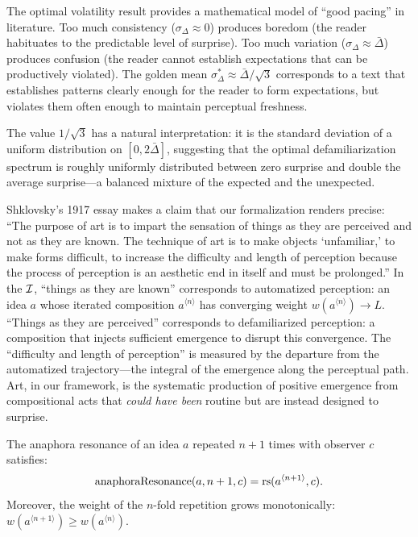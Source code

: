 \begin{remark}
The optimal volatility result provides a mathematical model of ``good
pacing'' in literature.  Too much consistency ($\sigma_\Delta \approx 0$)
produces boredom (the reader habituates to the predictable level of surprise).
Too much variation ($\sigma_\Delta \approx \bar{\Delta}$) produces confusion
(the reader cannot establish expectations that can be productively violated).
The golden mean $\sigma_\Delta^\ast \approx \bar{\Delta}/\sqrt{3}$ corresponds
to a text that establishes patterns clearly enough for the reader to form
expectations, but violates them often enough to maintain perceptual freshness.

The value $1/\sqrt{3}$ has a natural interpretation: it is the standard
deviation of a uniform distribution on $[0, 2\bar{\Delta}]$, suggesting that
the optimal defamiliarization spectrum is roughly uniformly distributed between
zero surprise and double the average surprise---a balanced mixture of the
expected and the unexpected.
\end{remark}


\begin{remark}
\label{rem:art-as-device}
Shklovsky's 1917 essay makes a claim that our formalization renders precise: ``The purpose of art is to impart the sensation of things as they are perceived and not as they are known.  The technique of art is to make objects `unfamiliar,' to make forms difficult, to increase the difficulty and length of perception because the process of perception is an aesthetic end in itself and must be prolonged.''  In the $\mathcal{I}$, ``things as they are known'' corresponds to automatized perception: an idea $a$ whose iterated composition $a^{\langle n \rangle}$ has converging weight $w(a^{\langle n \rangle}) \to L$.  ``Things as they are perceived'' corresponds to defamiliarized perception: a composition that injects sufficient emergence to disrupt this convergence.  The ``difficulty and length of perception'' is measured by the departure from the automatized trajectory---the integral of the emergence along the perceptual path.  Art, in our framework, is the systematic production of positive emergence from compositional acts that \emph{could have been} routine but are instead designed to surprise.
\end{remark}

\begin{theorem}
\label{thm:anaphora-growth}
The anaphora resonance of an idea $a$ repeated $n+1$ times with observer $c$ satisfies:
\[
  \text{anaphoraResonance}(a, n+1, c) = \mathrm{rs}(a^{\langle n+1 \rangle}, c).
\]
Moreover, the weight of the $n$-fold repetition grows monotonically: $w(a^{\langle n+1 \rangle}) \geq w(a^{\langle n \rangle})$.
\end{theorem}

